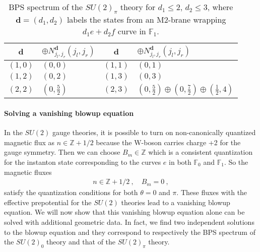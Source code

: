 \begin{table}[H]
	\centering
	\begin{tabular}{|c|C{25ex}||c|C{25ex}|} \hline
		$\mathbf{d}$ & $\oplus N_{j_l, j_r}^{\mathbf{d}} (j_l, j_r)$ & $\mathbf{d}$ & $\oplus N_{j_l, j_r}^{\mathbf{d}} (j_l, j_r)$ \\ \hline
		$ (1, 0) $ & $ (0, 0) $ & $ (1, 1) $ & $ (0, 1) $ \\ \hline
		$ (1, 2) $ & $ (0, 2) $ & $ (1, 3) $ & $ (0, 3) $ \\ \hline
		$ (2, 2) $ & $ (0, \frac{5}{2}) $ & $ (2, 3) $ & $ (0, \frac{5}{2}) \oplus (0, \frac{7}{2}) \oplus (\frac{1}{2}, 4) $ \\ \hline
	\end{tabular}
	\caption{ BPS spectrum of the $ SU(2)_\pi $  theory for $ d_1 \leq 2 $, $ d_2 \leq 3 $, where $ \mathbf{d} = (d_1, d_2) $ labels the states from an M2-brane wrapping $ d_1 e + d_2 f $ curve in $ \mathbb{F}_1 $.} \label{table:SU2_pi}
\end{table}

\paragraph{Solving a vanishing blowup equation}
In the $ SU(2) $ gauge theories, it is possible to turn on non-canonically quantized magnetic flux as $ n \in \mathbb{Z}+1/2 $ because the W-boson carries charge +2 for the gauge symmetry. Then we can choose $ B_m \in \mathbb{Z} $ which is a consistent quantization for the instanton state corresponding to the curves $ e $  in both $ \mathbb{F}_0 $ and $ \mathbb{F}_1 $. So the magnetic fluxes
\begin{align}\label{eq:su2_vanishing_flux}
n \in \mathbb{Z} + 1/2 \ , \quad
B_m = 0 \ ,
\end{align}
satisfy the quantization conditions for both $ \theta = 0 $ and $ \pi $. These fluxes with the effective prepotential for the $SU(2)$ theories lead to a vanishing blowup equation. We will now show that this vanishing blowup equation alone can be solved with additional geometric data. In fact, we find two independent solutions to the blowup equation and they correspond to respectively the BPS spectrum of the $SU(2)_0$ theory and that of the $SU(2)_\pi$ theory.


